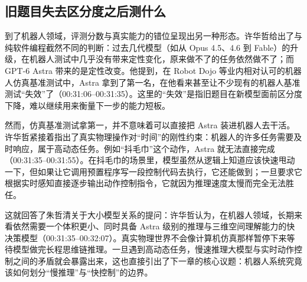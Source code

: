 \documentclass[UTF8,a4paper,11pt,fontset=fandol]{ctexart}
\begin{document}
\subsection{旧题目失去区分度之后测什么}
到了机器人领域，评测分数与真实能力的错位呈现出另一种形态。许华哲给出了与纯软件编程截然不同的判断：过去几代模型（如从 Opus 4.5、4.6 到 Fable）的升级，在机器人测试中几乎没有带来定性变化，原来做不了的任务依然做不了；而 GPT-6 Astra 带来的是定性改变。他提到，在 Robot Dojo 等业内相对认可的机器人仿真基准测试中，Astra 拿到了第一名，在他看来甚至让不少现有的机器人基准测试“失效”了（00:31:06–00:31:35）。这里的“失效”是指旧题目在新模型面前区分度下降，难以继续用来衡量下一步的能力短板。

然而，仿真基准测试拿第一，并不意味着可以直接把 Astra 装进机器人去干活。许华哲紧接着指出了真实物理操作对“时间”的刚性约束：机器人的许多任务需要及时响应，属于高动态任务。例如“抖毛巾”这个动作，Astra 就无法直接完成（00:31:35–00:31:55）。在抖毛巾的场景里，模型虽然从逻辑上知道应该快速甩动一下，但如果让它调用预置程序写一段控制代码去执行，它还能做到；一旦要求它根据实时感知直接逐步输出动作控制指令，它就因为推理速度太慢而完全无法胜任。

这就回答了朱哲清关于大小模型关系的提问：许华哲认为，在机器人领域，长期来看依然需要一个体积更小、同时具备 Astra 级别的推理与三维空间理解能力的快决策模型（00:31:35–00:32:07）。真实物理世界不会像计算机仿真那样暂停下来等待模型做完长程思维链推理。一旦遇到高动态任务，慢速推理大模型与实时动作控制之间的矛盾就会暴露出来，这也直接引出了下一章的核心议题：机器人系统究竟该如何划分“慢推理”与“快控制”的边界。
\end{document}
